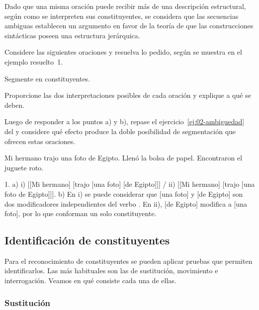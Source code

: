 \begin{destacado}
Dado que una misma oración puede recibir más de una descripción estructural,
según como se interpreten sus constituyentes, se considera que las secuencias
ambiguas establecen un argumento en favor de la teoría de que las construcciones
sintácticas poseen una estructura jerárquica.
\end{destacado}

\begin{ejercicio}\label{ej:05-homonimia}
Considere las siguientes oraciones y resuelva lo pedido, según se muestra en el
ejemplo resuelto~1.

\begin{consignas}
  \item Segmente en constituyentes.
  \item Proporcione las dos interpretaciones posibles de cada oración y explique
        a qué se deben.
  \item Luego de responder a los puntos a) y b), repase el
        ejercicio~\ref{ej:02-ambiguedad} del  y considere qué efecto
        produce la doble posibilidad de segmentación que ofrecen estas
        oraciones.
\end{consignas}

\begin{exe}
  \ex Mi hermano trajo una foto de Egipto.
  \ex Llenó la bolsa de papel.
  \ex Encontraron el juguete roto.
\end{exe}

\begin{resuelto}
1. a) i) [[Mi hermano] [trajo [una foto] [de Egipto]]] / ii) [[Mi hermano]
[trajo [una foto de Egipto]]]. b) En i) se puede considerar que [una foto] y
[de Egipto] son dos modificadores independientes del verbo . En
ii), [de Egipto] modifica a [una foto], por lo que conforman un solo
constituyente.
\end{resuelto}
\end{ejercicio}

\subsection{Identificación de constituyentes}\label{sec:05-pruebas}

Para el reconocimiento de constituyentes se pueden aplicar pruebas que permiten
identificarlos. Las más habituales son las de sustitución, movimiento e
interrogación. Veamos en qué consiste cada una de ellas.

\subsubsection{Sustitución}\label{sec:05-sustitucion}

